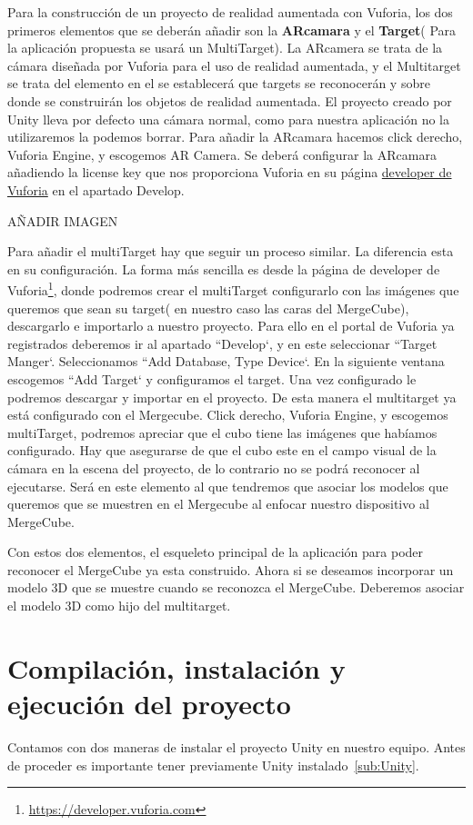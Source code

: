 Para la construcción de un proyecto de realidad aumentada con Vuforia, los dos primeros elementos que se deberán añadir son la \textbf{ARcamara} y el \textbf{Target}( Para la aplicación propuesta se usará un MultiTarget). La ARcamera se trata de la cámara diseñada por Vuforia para el uso de realidad aumentada, y el Multitarget se trata del elemento en el se establecerá que targets se reconocerán y sobre donde se construirán los objetos de realidad aumentada.
El proyecto creado por Unity lleva por defecto una cámara normal, como para nuestra aplicación no la utilizaremos la podemos borrar.
Para añadir la ARcamara hacemos click derecho, Vuforia Engine, y escogemos AR Camera. Se deberá configurar la ARcamara añadiendo la license key que nos proporciona Vuforia en su página \href{https://developer.vuforia.com/license-manager}{developer de Vuforia} en el apartado Develop.

AÑADIR IMAGEN

Para añadir el multiTarget hay que seguir un proceso similar. La diferencia esta en su configuración. La forma más sencilla es desde la página de developer de Vuforia\footnote{\url{https://developer.vuforia.com}}, donde podremos crear el multiTarget configurarlo con las imágenes que queremos que sean su target( en nuestro caso las caras del MergeCube), descargarlo e importarlo a nuestro proyecto. Para ello en el portal de Vuforia ya registrados deberemos ir al apartado ``Develop`, y en este seleccionar ``Target Manger`. Seleccionamos ``Add Database, Type Device`. En la siguiente ventana escogemos ``Add Target` y configuramos el target. Una vez configurado le podremos descargar y importar en el proyecto.
De esta manera el multitarget ya está configurado con el Mergecube.
Click derecho, Vuforia Engine, y escogemos multiTarget, podremos apreciar que el cubo tiene las imágenes que habíamos configurado. Hay que asegurarse de que el cubo este en el campo visual de la cámara en la escena del proyecto, de lo contrario no se podrá reconocer al ejecutarse. Será en este elemento al que tendremos que asociar los modelos que queremos que se muestren en el Mergecube al enfocar nuestro dispositivo al MergeCube.


Con estos dos elementos, el esqueleto principal de la aplicación para poder reconocer el MergeCube ya esta construido. Ahora si se deseamos incorporar un modelo 3D que se muestre cuando se reconozca el MergeCube. Deberemos asociar el modelo 3D como hijo del multitarget.



\section{Compilación, instalación y ejecución del proyecto}
Contamos con dos maneras de instalar el proyecto Unity en nuestro equipo. Antes de proceder es importante tener previamente Unity instalado~\ref{sub:Unity}.


